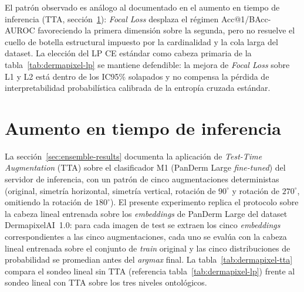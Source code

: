 El patrón observado es análogo al documentado en el aumento en
tiempo de inferencia (TTA, sección~\ref{sec:dermapixel-tta}):
\emph{Focal Loss} desplaza el régimen Acc@1/BAcc-AUROC
favoreciendo la primera dimensión sobre la segunda, pero no
resuelve el cuello de botella estructural impuesto por la
cardinalidad y la cola larga del dataset. La elección del LP CE
estándar como cabeza primaria de la tabla~\ref{tab:dermapixel-lp}
se mantiene defendible: la mejora de \emph{Focal Loss} sobre L1 y
L2 está dentro de los IC95\% solapados y no compensa la pérdida
de interpretabilidad probabilística calibrada de la entropía
cruzada estándar.

\section{Aumento en tiempo de inferencia}
\label{sec:dermapixel-tta}

La sección~\ref{sec:ensemble-results} documenta la aplicación de
\emph{Test-Time Augmentation} (TTA) sobre el clasificador M1
(PanDerm Large \emph{fine-tuned}) del servidor de inferencia, con un
patrón de cinco augmentaciones deterministas (original, simetría
horizontal, simetría vertical, rotación de $90^\circ$ y rotación de
$270^\circ$, omitiendo la rotación de $180^\circ$). El presente
experimento replica el protocolo sobre la cabeza lineal entrenada
sobre los \emph{embeddings} de PanDerm Large del dataset
DermapixelAI~1.0: para cada imagen de test se extraen los cinco
\emph{embeddings} correspondientes a las cinco augmentaciones, cada
uno se evalúa con la cabeza lineal entrenada sobre el conjunto de
\emph{train} original y las cinco distribuciones de probabilidad se
promedian antes del \emph{argmax} final. La
tabla~\ref{tab:dermapixel-tta} compara el sondeo lineal sin TTA
(referencia tabla~\ref{tab:dermapixel-lp}) frente al sondeo lineal
con TTA sobre los tres niveles ontológicos.

